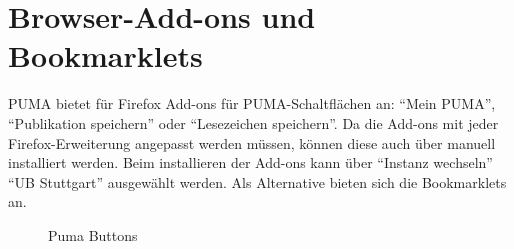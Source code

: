 \section{Browser-Add-ons\label{sec:addon} und Bookmarklets}\label{sec:button}
PUMA bietet für Firefox Add-ons für PUMA-Schaltflächen an: \enquote{Mein PUMA}, \enquote{Publikation speichern} oder \enquote{Lesezeichen speichern}. Da die Add-ons mit jeder Firefox-Erweiterung angepasst werden müssen, können diese auch über  manuell installiert werden. Beim installieren der Add-ons kann über \enquote{Instanz wechseln} \enquote{UB Stuttgart} ausgewählt werden. Als Alternative bieten sich die Bookmarklets an.\newline
\begin{figure}[h!]
 \centering
 \caption{Puma Buttons}
 \label{fig:pumaButtons}
\end{figure} 
